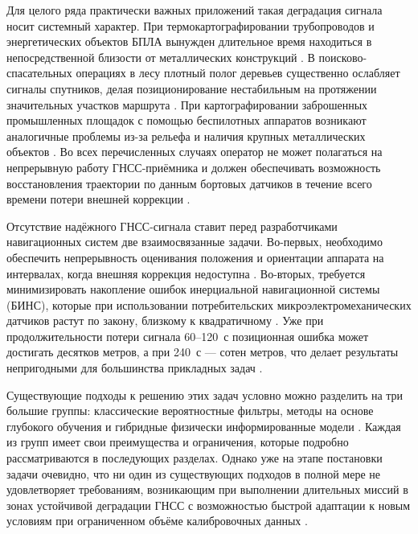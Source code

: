 Для целого ряда практически важных приложений такая деградация сигнала носит системный характер. При термокартографировании трубопроводов и энергетических объектов БПЛА вынужден длительное время находиться в непосредственной близости от металлических конструкций \cite{Kim2023, Wang2025, uav_inspection}. В поисково-спасательных операциях в лесу плотный полог деревьев существенно ослабляет сигналы спутников, делая позиционирование нестабильным на протяжении значительных участков маршрута \cite{Pang2024, Tavasci2024}. При картографировании заброшенных промышленных площадок с помощью беспилотных аппаратов возникают аналогичные проблемы из-за рельефа и наличия крупных металлических объектов \cite{Kim2023, Dlamini2025}. Во всех перечисленных случаях оператор не может полагаться на непрерывную работу ГНСС-приёмника и должен обеспечивать возможность восстановления траектории по данным бортовых датчиков в течение всего времени потери внешней коррекции \cite{Pang2024, Niu2026, Alaba2024}.

Отсутствие надёжного ГНСС-сигнала ставит перед разработчиками навигационных систем две взаимосвязанные задачи. Во-первых, необходимо обеспечить непрерывность оценивания положения и ориентации аппарата на интервалах, когда внешняя коррекция недоступна \cite{Chen2024, Niu2026, Alaba2024}. Во-вторых, требуется минимизировать накопление ошибок инерциальной навигационной системы (БИНС), которые при использовании потребительских микроэлектромеханических датчиков растут по закону, близкому к квадратичному \cite{Chen2024, Shin2024LSTM, Alaba2024}. Уже при продолжительности потери сигнала 60–120~с позиционная ошибка может достигать десятков метров, а при 240~с — сотен метров, что делает результаты непригодными для большинства прикладных задач \cite{Pang2024, Tavasci2024, Niu2026}.

Существующие подходы к решению этих задач условно можно разделить на три большие группы: классические вероятностные фильтры, методы на основе глубокого обучения и гибридные физически информированные модели \cite{Chen2024, Bianchi2024, Sivtsov2025}. Каждая из групп имеет свои преимущества и ограничения, которые подробно рассматриваются в последующих разделах. Однако уже на этапе постановки задачи очевидно, что ни один из существующих подходов в полной мере не удовлетворяет требованиям, возникающим при выполнении длительных миссий в зонах устойчивой деградации ГНСС с возможностью быстрой адаптации к новым условиям при ограниченном объёме калибровочных данных \cite{Chen2024, Liu2025, Niu2026}.

